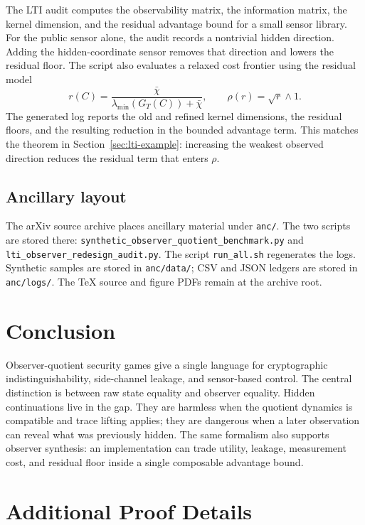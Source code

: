 \documentclass[11pt]{article}
\theoremstyle{definition}
\theoremstyle{plain}
\theoremstyle{remark}
\begin{document}
The LTI audit computes the observability matrix, the information matrix, the kernel dimension, and the residual advantage bound for a small sensor library. For the public sensor alone, the audit records a nontrivial hidden direction. Adding the hidden-coordinate sensor removes that direction and lowers the residual floor. The script also evaluates a relaxed cost frontier using the residual model
\[
    r(C)=\frac{\bar\chi}{\lambda_{\min}(G_T(C))+\bar\chi},
    \qquad \rho(r)=\sqrt r\wedge 1.
\]
The generated log reports the old and refined kernel dimensions, the residual floors, and the resulting reduction in the bounded advantage term. This matches the theorem in Section~\ref{sec:lti-example}: increasing the weakest observed direction reduces the residual term that enters $\rho$.

\subsection{Ancillary layout}

The arXiv source archive places ancillary material under \texttt{anc/}. The two scripts are stored there: \texttt{synthetic\_observer\_quotient\_benchmark.py} and \texttt{lti\_observer\_redesign\_audit.py}. The script \texttt{run\_all.sh} regenerates the logs. Synthetic samples are stored in \texttt{anc/data/}; CSV and JSON ledgers are stored in \texttt{anc/logs/}. The TeX source and figure PDFs remain at the archive root.

\section{Conclusion}

Observer-quotient security games give a single language for cryptographic indistinguishability, side-channel leakage, and sensor-based control. The central distinction is between raw state equality and observer equality. Hidden continuations live in the gap. They are harmless when the quotient dynamics is compatible and trace lifting applies; they are dangerous when a later observation can reveal what was previously hidden. The same formalism also supports observer synthesis: an implementation can trade utility, leakage, measurement cost, and residual floor inside a single composable advantage bound.

\appendix

\section{Additional Proof Details}
\end{document}
